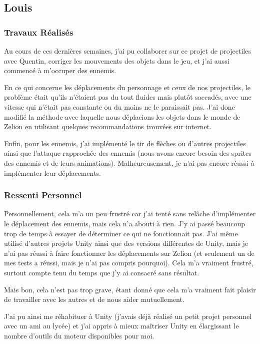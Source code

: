 \documentclass[a4page, 14pt]{extarticle}
\begin{document}
    \subsection{Louis}
        \subsubsection{Travaux Réalisés}
            {Au cours de ces dernières semaines, j'ai pu collaborer sur ce projet de projectiles avec Quentin, corriger les mouvements des objets dans le jeu, et j'ai aussi commencé à m'occuper des ennemis.
            
            En ce qui concerne les déplacements du personnage et ceux de nos projectiles, le problème était qu'ils n'étaient pas du tout fluides mais plutôt saccadés, avec une vitesse qui n'était pas constante ou du moins ne le paraissait pas. J'ai donc modifié la méthode avec laquelle nous déplacions les objets dans le monde de Zelion en utilisant quelques recommandations trouvées sur internet.
            
            Enfin, pour les ennemis, j'ai implémenté le tir de flèches ou d'autres projectiles ainsi que l'attaque rapprochée des ennemis (nous avons encore besoin des sprites des ennemis et de leurs animations). Malheureusement, je n'ai pas encore réussi à implémenter leur déplacements.}
        \subsubsection{Ressenti Personnel}
            {Personnellement, cela m'a un peu frustré car j'ai tenté sans relâche d'implémenter le déplacement des ennemis, mais cela n'a abouti à rien. J'y ai passé beaucoup trop de temps à essayer de déterminer ce qui ne fonctionnait pas. J'ai même utilisé d'autres projets Unity ainsi que des versions différentes de Unity, mais je n'ai pas réussi à faire fonctionner les déplacements sur Zelion (et seulement un de mes tests a réussi, mais je n'ai pas compris pourquoi). Cela m'a vraiment frustré, surtout compte tenu du temps que j'y ai consacré sans résultat.
            
            Mais bon, cela n'est pas trop grave, étant donné que cela m'a vraiment fait plaisir de travailler avec les autres et de nous aider mutuellement.
            
            J'ai pu ainsi me réhabituer à Unity (j'avais déjà réalisé un petit projet personnel avec un ami au lycée) et j'ai appris à mieux maîtriser Unity en élargissant le nombre d'outils du moteur disponibles pour moi.}
\end{document}
